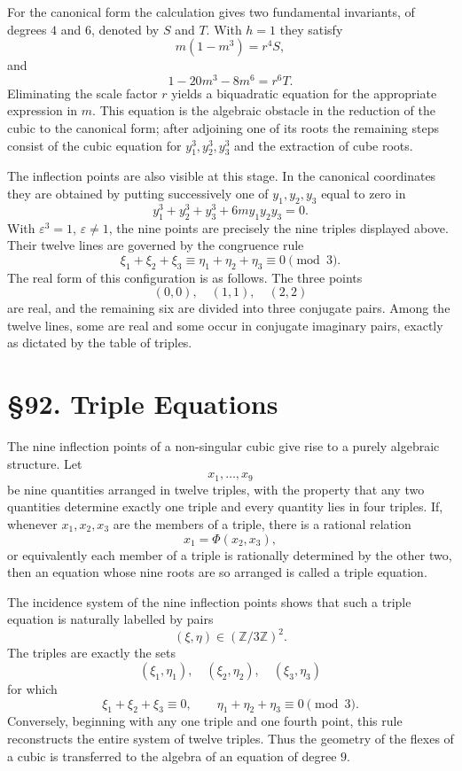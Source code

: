 \documentclass[12pt,a4paper]{article}
\newcommand{\webersection}[2]{\section*{\S #1. #2}\addcontentsline{toc}{section}{\S #1. #2}}
\begin{document}
For the canonical form the calculation gives two fundamental invariants, of degrees \(4\) and \(6\), denoted by \(S\) and \(T\).  With \(h=1\) they satisfy
\[
m(1-m^3)=r^4S,
\]
and
\[
1-20m^3-8m^6=r^6T.
\]
Eliminating the scale factor \(r\) yields a biquadratic equation for the appropriate expression in \(m\).  This equation is the algebraic obstacle in the reduction of the cubic to the canonical form; after adjoining one of its roots the remaining steps consist of the cubic equation for \(y_1^3,y_2^3,y_3^3\) and the extraction of cube roots.

The inflection points are also visible at this stage.  In the canonical coordinates they are obtained by putting successively one of \(y_1,y_2,y_3\) equal to zero in
\[
y_1^3+y_2^3+y_3^3+6my_1y_2y_3=0.
\]
With \(\varepsilon^3=1\), \(\varepsilon\ne1\), the nine points are precisely the nine triples displayed above.  Their twelve lines are governed by the congruence rule
\[
\xi_1+\xi_2+\xi_3\equiv
\eta_1+\eta_2+\eta_3\equiv0\pmod3.
\]
The real form of this configuration is as follows.  The three points
\[
(0,0),\quad(1,1),\quad(2,2)
\]
are real, and the remaining six are divided into three conjugate pairs.  Among the twelve lines, some are real and some occur in conjugate imaginary pairs, exactly as dictated by the table of triples.

\webersection{92}{Triple Equations}

The nine inflection points of a non-singular cubic give rise to a purely algebraic structure.  Let
\[
x_1,\dots,x_9
\]
be nine quantities arranged in twelve triples, with the property that any two quantities determine exactly one triple and every quantity lies in four triples.  If, whenever \(x_1,x_2,x_3\) are the members of a triple, there is a rational relation
\[
x_1=\Phi(x_2,x_3),
\]
or equivalently each member of a triple is rationally determined by the other two, then an equation whose nine roots are so arranged is called a triple equation.

The incidence system of the nine inflection points shows that such a triple equation is naturally labelled by pairs
\[
(\xi,\eta)\in(\mathbb Z/3\mathbb Z)^2.
\]
The triples are exactly the sets
\[
(\xi_1,\eta_1),\quad(\xi_2,\eta_2),\quad(\xi_3,\eta_3)
\]
for which
\[
\xi_1+\xi_2+\xi_3\equiv0,\qquad
\eta_1+\eta_2+\eta_3\equiv0\pmod3.
\]
Conversely, beginning with any one triple and one fourth point, this rule reconstructs the entire system of twelve triples.  Thus the geometry of the flexes of a cubic is transferred to the algebra of an equation of degree \(9\).
\end{document}
